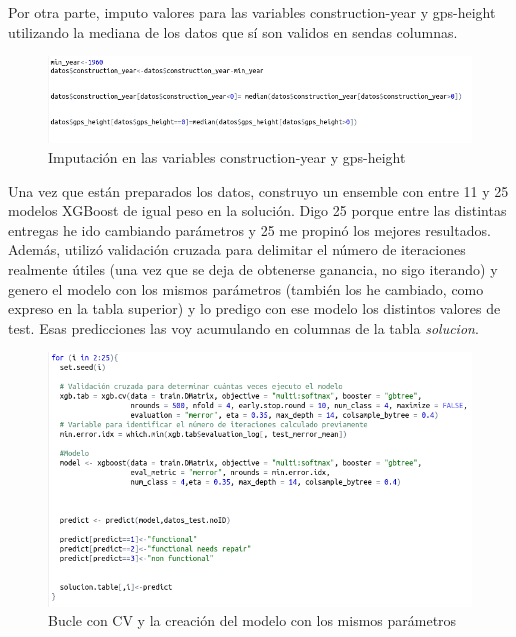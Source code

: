 Por otra parte, imputo valores para las variables construction-year y gps-height utilizando la mediana de los datos que sí son validos en sendas columnas. 

\begin{figure}[H] %
	\centering
	\includegraphics[scale=0.5]{mv.png}  %
	\caption{Imputación en las variables construction-year y gps-height} 
	\label{fig:mv}
\end{figure}




Una vez que están preparados los datos, construyo un ensemble con entre 11 y 25 modelos XGBoost de igual peso en la solución. Digo 25 porque entre las distintas entregas he ido cambiando parámetros y 25 me propinó los mejores resultados. Además, utilizó validación cruzada para delimitar el número de iteraciones realmente útiles (una vez que se deja de obtenerse ganancia, no sigo iterando) y genero el modelo con los mismos parámetros (también los he cambiado, como expreso en la tabla superior) y lo predigo con ese modelo los distintos valores de test. Esas predicciones las voy acumulando en columnas de la tabla \textit{solucion}.

\begin{figure}[H] %
	\centering
	\includegraphics[scale=0.5]{modelo-ensemble.png}  %
	\caption{Bucle con CV y la creación del modelo con los mismos parámetros} 
	\label{fig:modelo}
\end{figure}

